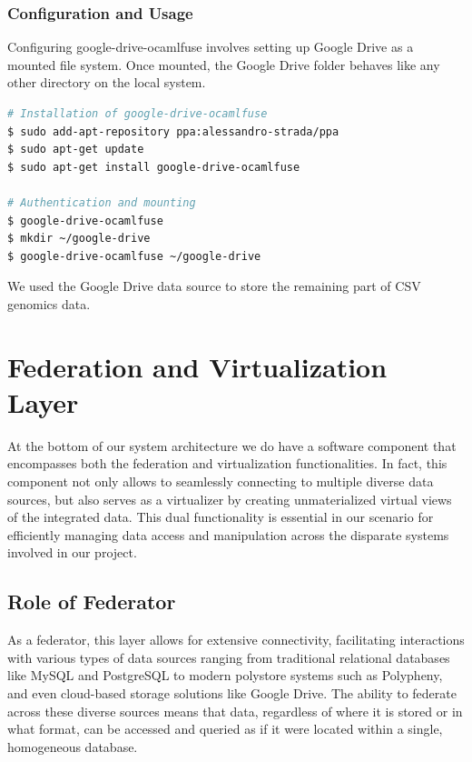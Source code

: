\subsubsection{Configuration and Usage}
Configuring google-drive-ocamlfuse involves setting up Google Drive as a mounted file system. Once mounted, the Google Drive folder behaves like any other directory on the local system.
\begin{lstlisting}[language=bash, caption={google-drive-ocamlfuse Tool installation procedure}, label={lst:ocamlfuse}]
# Installation of google-drive-ocamlfuse
$ sudo add-apt-repository ppa:alessandro-strada/ppa
$ sudo apt-get update
$ sudo apt-get install google-drive-ocamlfuse

# Authentication and mounting
$ google-drive-ocamlfuse
$ mkdir ~/google-drive
$ google-drive-ocamlfuse ~/google-drive
\end{lstlisting}
We used the Google Drive data source to store the remaining part of \ac{CSV} genomics data.


\section{Federation and Virtualization Layer}
At the bottom of our system architecture we do have a software component that encompasses both the federation and virtualization functionalities. In fact, this component not only allows to seamlessly connecting to multiple diverse data sources, but also serves as a virtualizer by creating unmaterialized virtual views of the integrated data. This dual functionality is essential in our scenario for efficiently managing data access and manipulation across the disparate systems involved in our project.
\subsection{Role of Federator}
As a federator, this layer allows for extensive connectivity, facilitating interactions with various types of data sources ranging from traditional relational databases like MySQL and PostgreSQL to modern polystore systems such as Polypheny, and even cloud-based storage solutions like Google Drive. The ability to federate across these diverse sources means that data, regardless of where it is stored or in what format, can be accessed and queried as if it were located within a single, homogeneous database.

